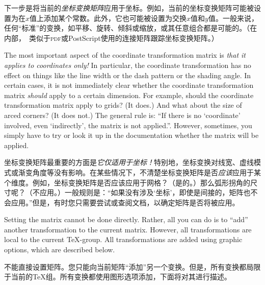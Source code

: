 下一步是将当前的\emph{坐标变换矩阵}应用于坐标。例如，当前的坐标变换矩阵可能被设置为在$x$值上添加某个常数。此外，它也可能被设置为交换$x$值和$y$值。一般来说，任何“标准”的变换，如平移、旋转、倾斜或缩放，或其任意组合都是可能的。（在内部，\pgfname\ 类似于\textsc{pdf}或PostScript使用的连接矩阵跟踪坐标变换矩阵。）


\begin{codeexample}[]
\end{codeexample}

The most important aspect of the coordinate transformation matrix is \emph{that
it applies to coordinates only!} In particular, the coordinate transformation
has no effect on things like the line width or the dash pattern or the shading
angle. In certain cases, it is not immediately clear whether the coordinate
transformation matrix \emph{should} apply to a certain dimension. For example,
should the coordinate transformation matrix apply to grids? (It does.) And what
about the size of arced corners? (It does not.) The general rule is: ``If there
is no `coordinate' involved, even `indirectly', the matrix is not applied.''.
However, sometimes, you simply have to try or look it up in the documentation
whether the matrix will be applied.

坐标变换矩阵最重要的方面是\emph{它仅适用于坐标！}特别地，坐标变换对线宽、虚线模式或渐变角度等没有影响。在某些情况下，不清楚坐标变换矩阵是否\emph{应该}应用于某个维度。例如，坐标变换矩阵是否应该应用于网格？（是的。）那么弧形拐角的尺寸呢？（不应用。）一般规则是：“如果没有涉及‘坐标’，即使是间接的，矩阵也不会应用。”但是，有时您只需要尝试或查阅文档，以确定矩阵是否将被应用。

Setting the matrix cannot be done directly. Rather, all you can do is to
``add'' another transformation to the current matrix. However, all
transformations are local to the current \TeX-group. All transformations are
added using graphic options, which are described below.

不能直接设置矩阵。您只能向当前矩阵“添加”另一个变换。但是，所有变换都局限于当前的\TeX 组。所有变换都使用图形选项添加，下面将对其进行描述。

